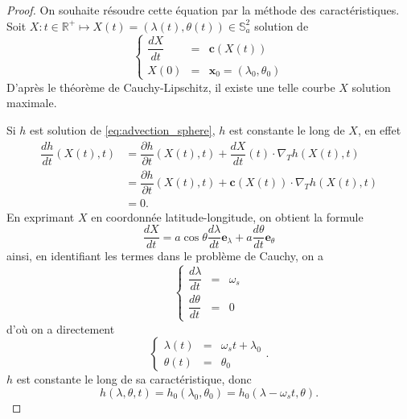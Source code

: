 \begin{proof}
On souhaite résoudre cette équation par la méthode des caractéristiques. Soit $X : t \in \mathbb{R}^+ \mapsto X(t)=(\lambda(t), \theta(t)) \in \mathbb{S}_a^2$ solution de 
\begin{equation}
\left\lbrace
\begin{array}{rcl}
\dfrac{dX}{dt} & = & \mathbf{c}(X(t)) \\
X(0) & = & \mathbf{x}_0 = (\lambda_0, \theta_0)
\end{array}
\right.
\label{eq:cauchy_sphere1}
\end{equation}
D'après le théorème de Cauchy-Lipschitz, il existe une telle courbe $X$ solution maximale.

Si $h$ est solution de \eqref{eq:advection_sphere}, $h$ est constante le long de $X$, en effet
\begin{align*}
\dfrac{dh}{dt}(X(t),t) & = \dfrac{\partial h}{\partial t} (X(t),t) + \dfrac{d X}{dt}(t) \cdot \nabla_T h(X(t),t) \\
& = \dfrac{\partial h}{\partial t} (X(t),t) + \mathbf{c}(X(t)) \cdot \nabla_T h(X(t),t) \\
& = 0.
\end{align*}
En exprimant $X$ en coordonnée latitude-longitude, on obtient la formule
\begin{equation}
\dfrac{dX}{dt} = a \cos \theta \dfrac{d \lambda}{dt} \mathbf{e}_{\lambda} + a \dfrac{d \theta}{d t} \mathbf{e}_{\theta}
\end{equation}
ainsi, en identifiant les termes dans le problème de Cauchy, on a
\begin{equation}
\left\lbrace
\begin{array}{rcl}
\dfrac{d \lambda}{d t} & = & \omega_s \\
\dfrac{d \theta}{d t}  & = & 0
\end{array}
\right.
\end{equation}
d'où on a directement
\begin{equation}
\left\lbrace
\begin{array}{rcl}
\lambda(t) & = & \omega_s t + \lambda_0 \\
\theta(t)  & = & \theta_0
\end{array}
\right. .
\end{equation}
$h$ est constante le long de sa caractéristique, donc
\begin{equation}
h(\lambda, \theta, t) = h_0(\lambda_0 , \theta_0 ) = h_0(\lambda - \omega_s t, \theta ). 
\end{equation}
\end{proof}

